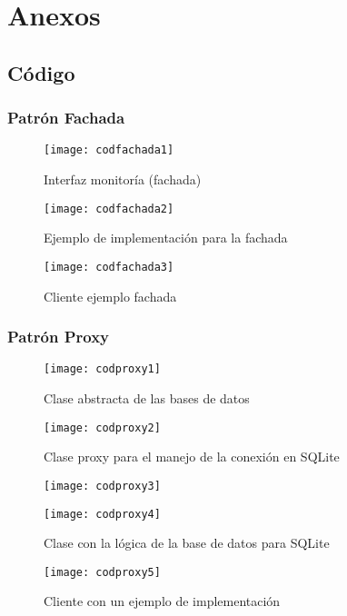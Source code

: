 \chapter{Anexos}
\section{Código}
\subsection{Patrón Fachada}
\begin{figure}[H]
	\centering
	\texttt{[image: codfachada1]}
	\centering
	\caption{Interfaz monitoría (fachada)}
	\label{fig:codfachada1}
\end{figure}
\clearpage
\begin{figure}[H]
	\centering
	\texttt{[image: codfachada2]}
	\centering
	\caption{Ejemplo de implementación para la fachada}
	\label{fig:codfachada2}
\end{figure}
\begin{figure}[H]
	\centering
	\texttt{[image: codfachada3]}
	\centering
	\caption{Cliente ejemplo fachada}
	\label{fig:codfachada3}
\end{figure}
\subsection{Patrón Proxy}
\begin{figure}[H]
	\centering
	\texttt{[image: codproxy1]}
	\centering
	\caption{Clase abstracta de las bases de datos}
	\label{fig:codproxy1}
\end{figure}
\clearpage
\begin{figure}[H]
	\centering
	\texttt{[image: codproxy2]}
	\centering
	\caption{Clase proxy para el manejo de la conexión en SQLite}
	\label{fig:codproxy2}
\end{figure}
\begin{figure}[H]
	\centering
	\texttt{[image: codproxy3]}
	\centering
	\label{fig:codproxy3}
\end{figure}
\begin{figure}[H]

	\texttt{[image: codproxy4]}
	\caption{Clase con la lógica de la base de datos para SQLite}

\end{figure}
\begin{figure}[H]
	\centering
	\texttt{[image: codproxy5]}
	\centering
		\caption{Cliente con un ejemplo de implementación}
	\label{fig:codproxy5}
\end{figure}

